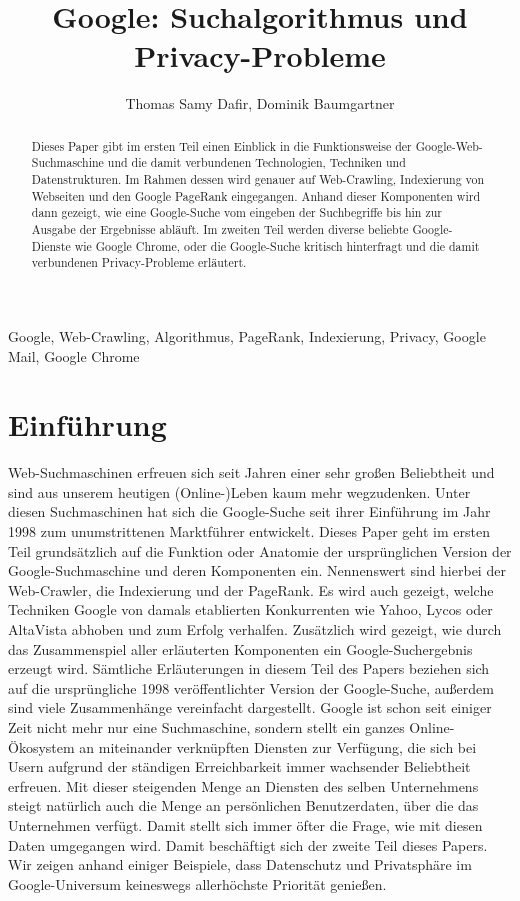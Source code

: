 \documentclass[12pt, a4paper]{llncs}
\title{Google: Suchalgorithmus und Privacy-Probleme}
\author{Thomas Samy Dafir, Dominik Baumgartner}
\institute{Wissenschaftliche Arbeitstechniken und Präsentation,\newline
	Fachbereich Computerwissenschaften,\newline Universität Salzburg}
\begin{document}
	\maketitle
	\begin{abstract}
	Dieses Paper gibt im ersten Teil einen Einblick in die Funktionsweise der Google-Web-Suchmaschine und die 
	damit verbundenen Technologien, Techniken und Datenstrukturen. Im Rahmen dessen wird genauer auf Web-Crawling,
	Indexierung von Webseiten und den Google PageRank eingegangen. Anhand dieser Komponenten wird dann gezeigt, wie
	eine Google-Suche vom eingeben der Suchbegriffe bis hin zur Ausgabe der Ergebnisse abläuft.
	Im zweiten Teil werden diverse beliebte Google-Dienste wie Google Chrome, oder die Google-Suche
	kritisch hinterfragt und die damit verbundenen Privacy-Probleme erläutert.
	\end{abstract}
	\begin{small}
		\begin{keywords}
		Google, Web-Crawling, Algorithmus, PageRank, Indexierung, Privacy, Google Mail, Google Chrome
		\end{keywords}
	\end{small}
	
	\section{Einführung}
	Web-Suchmaschinen erfreuen sich seit Jahren einer sehr großen Beliebtheit und sind aus unserem heutigen (Online-)Leben kaum 
	mehr wegzudenken. Unter diesen Suchmaschinen hat sich die Google-Suche seit ihrer Einführung im Jahr 1998 zum 
	unumstrittenen Marktführer entwickelt. Dieses Paper geht im ersten Teil grundsätzlich auf die Funktion oder 
	Anatomie der ursprünglichen Version der Google-Suchmaschine und deren Komponenten ein. Nennenswert sind hierbei 
	der Web-Crawler, die Indexierung und der PageRank. Es wird auch gezeigt, welche Techniken Google von damals	etablierten
	Konkurrenten wie Yahoo, Lycos oder AltaVista abhoben und zum Erfolg verhalfen. Zusätzlich wird gezeigt, wie durch
	das Zusammenspiel aller erläuterten Komponenten ein Google-Suchergebnis erzeugt wird. Sämtliche Erläuterungen in
	diesem Teil des Papers beziehen sich auf die ursprüngliche 1998 veröffentlichter Version der Google-Suche, außerdem 
	sind viele Zusammenhänge vereinfacht dargestellt.\newline
	Google ist schon seit einiger Zeit nicht mehr nur eine Suchmaschine, sondern stellt ein ganzes Online-Ökosystem an
	miteinander verknüpften Diensten zur Verfügung, die sich bei Usern aufgrund der ständigen Erreichbarkeit immer 
	wachsender Beliebtheit erfreuen. Mit dieser steigenden Menge an Diensten des selben Unternehmens steigt natürlich 
	auch die Menge an persönlichen Benutzerdaten, über die das Unternehmen verfügt. Damit stellt sich immer öfter die Frage,
	wie mit diesen Daten umgegangen wird. Damit beschäftigt sich der zweite Teil dieses Papers. Wir zeigen anhand 
	einiger Beispiele, dass Datenschutz und Privatsphäre im Google-Universum keineswegs allerhöchste Priorität genießen.
	
\end{document}
